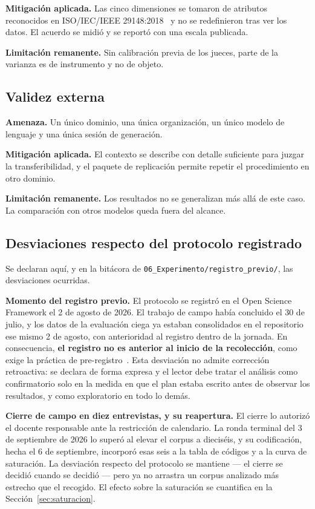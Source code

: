 \documentclass[11pt,a4paper]{article}
\begin{document}
\textbf{Mitigaci\'on aplicada.} Las cinco dimensiones se tomaron de atributos
reconocidos en ISO/IEC/IEEE 29148:2018~\cite{iso29148_2018} y no se redefinieron tras
ver los datos. El acuerdo se midi\'o y se report\'o con una escala publicada.

\textbf{Limitaci\'on remanente.} Sin calibraci\'on previa de los jueces, parte de la
varianza es de instrumento y no de objeto.

\subsection{Validez externa}

\textbf{Amenaza.} Un \'unico dominio, una \'unica organizaci\'on, un \'unico modelo de
lenguaje y una \'unica sesi\'on de generaci\'on.

\textbf{Mitigaci\'on aplicada.} El contexto se describe con detalle suficiente para
juzgar la transferibilidad, y el paquete de replicaci\'on permite repetir el
procedimiento en otro dominio.

\textbf{Limitaci\'on remanente.} Los resultados no se generalizan m\'as all\'a de este
caso. La comparaci\'on con otros modelos queda fuera del alcance.

\subsection{Desviaciones respecto del protocolo registrado}

Se declaran aqu\'i, y en la bit\'acora de
\texttt{06\_Experimento/registro\_previo/}, las desviaciones ocurridas.

\textbf{Momento del registro previo.} El protocolo se registr\'o en el Open Science
Framework el 2 de agosto de 2026. El trabajo de campo hab\'ia concluido el 30 de julio,
y los datos de la evaluaci\'on ciega ya estaban consolidados en el repositorio ese mismo
2 de agosto, con anterioridad al registro dentro de la jornada. En consecuencia,
\textbf{el registro no es anterior al inicio de la recolecci\'on}, como exige la
pr\'actica de pre-registro~\cite{nosek2018preregistration}. Esta desviaci\'on no admite
correcci\'on retroactiva: se declara de forma expresa y el lector debe tratar el
an\'alisis como confirmatorio solo en la medida en que el plan estaba escrito antes de
observar los resultados, y como exploratorio en todo lo dem\'as.

\textbf{Cierre de campo en diez entrevistas, y su reapertura.} El cierre lo autoriz\'o el
docente responsable ante la restricci\'on de calendario. La ronda terminal del 3 de
septiembre de 2026 lo super\'o al elevar el corpus a diecis\'eis, y su codificaci\'on, hecha
el 6 de septiembre, incorpor\'o esas seis a la tabla de c\'odigos y a la curva de
saturaci\'on. La desviaci\'on respecto del protocolo se mantiene --- el cierre se decidi\'o
cuando se decidi\'o --- pero ya no arrastra un corpus analizado m\'as estrecho que el
recogido. El efecto sobre la saturaci\'on se cuantifica en la
Secci\'on~\ref{sec:saturacion}.
\end{document}

